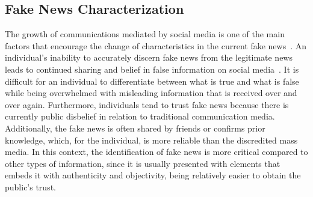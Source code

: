 \documentclass{ieeeaccess}
\begin{document}
\subsection{Fake News Characterization}

The growth of communications mediated by social media is one of the main factors that encourage the change of characteristics in the current fake news~\cite{sharma2019combating}. An individual's inability to accurately discern fake news from the legitimate news leads to continued sharing and belief in false information on social media~\cite{zhou2018fake, wang2017liar, rubin2010deception, rubin2016fake}. It is difficult for an individual to differentiate between what is true and what is false while being overwhelmed with misleading information that is received over and over again. Furthermore, individuals tend to trust fake news because there is currently public disbelief in relation to traditional communication media. Additionally, the fake news is often shared by friends or confirms prior knowledge, which, for the individual, is more reliable than the discredited mass media. In this context, the identification of fake news is more critical compared to other types of information, since it is usually presented with elements that embeds it with authenticity and objectivity, being relatively easier to obtain the public's trust.

\end{document}
